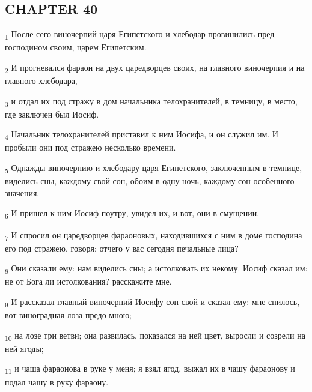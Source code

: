 \subsection{CHAPTER 40}
\begin{tcolorbox}
\textsubscript{1} После сего виночерпий царя Египетского и хлебодар провинились пред господином своим, царем Египетским.
\end{tcolorbox}
\begin{tcolorbox}
\textsubscript{2} И прогневался фараон на двух царедворцев своих, на главного виночерпия и на главного хлебодара,
\end{tcolorbox}
\begin{tcolorbox}
\textsubscript{3} и отдал их под стражу в дом начальника телохранителей, в темницу, в место, где заключен был Иосиф.
\end{tcolorbox}
\begin{tcolorbox}
\textsubscript{4} Начальник телохранителей приставил к ним Иосифа, и он служил им. И пробыли они под стражею несколько времени.
\end{tcolorbox}
\begin{tcolorbox}
\textsubscript{5} Однажды виночерпию и хлебодару царя Египетского, заключенным в темнице, виделись сны, каждому свой сон, обоим в одну ночь, каждому сон особенного значения.
\end{tcolorbox}
\begin{tcolorbox}
\textsubscript{6} И пришел к ним Иосиф поутру, увидел их, и вот, они в смущении.
\end{tcolorbox}
\begin{tcolorbox}
\textsubscript{7} И спросил он царедворцев фараоновых, находившихся с ним в доме господина его под стражею, говоря: отчего у вас сегодня печальные лица?
\end{tcolorbox}
\begin{tcolorbox}
\textsubscript{8} Они сказали ему: нам виделись сны; а истолковать их некому. Иосиф сказал им: не от Бога ли истолкования? расскажите мне.
\end{tcolorbox}
\begin{tcolorbox}
\textsubscript{9} И рассказал главный виночерпий Иосифу сон свой и сказал ему: мне снилось, вот виноградная лоза предо мною;
\end{tcolorbox}
\begin{tcolorbox}
\textsubscript{10} на лозе три ветви; она развилась, показался на ней цвет, выросли и созрели на ней ягоды;
\end{tcolorbox}
\begin{tcolorbox}
\textsubscript{11} и чаша фараонова в руке у меня; я взял ягод, выжал их в чашу фараонову и подал чашу в руку фараону.
\end{tcolorbox}
